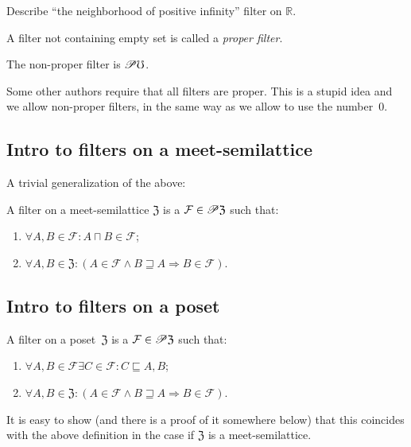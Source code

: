 \begin{xca}
Describe ``the neighborhood of positive infinity'' filter on $\mathbb{R}$.\end{xca}
\begin{defn}
A filter not containing empty set is called
a \emph{proper filter}.\end{defn}
\begin{obvious}
The non-proper filter is $\mathscr{P}\mho$.\end{obvious}
\begin{rem}
Some other authors require that all filters are proper. This is a
stupid idea and we allow non-proper filters, in the same way as we
allow to use the number~$0$.
\end{rem}

\subsection{Intro to filters on a meet-semilattice}

A trivial generalization of the above:
\begin{defn}
A filter on a meet-semilattice
$\mathfrak{Z}$ is a $\mathcal{F}\in\mathscr{P}\mathfrak{Z}$ such that:
\begin{enumerate}
\item $\forall A,B\in\mathcal{F}:A\sqcap B\in\mathcal{F}$;
\item $\forall A,B\in\mathfrak{Z}:(A\in\mathcal{F}\land B\sqsupseteq A\Rightarrow B\in\mathcal{F})$.
\end{enumerate}
\end{defn}

\subsection{Intro to filters on a poset}
\begin{defn}
A filter on a poset~$\mathfrak{Z}$ is
a $\mathcal{F}\in\mathscr{P}\mathfrak{Z}$ such that:
\begin{enumerate}
\item $\forall A,B\in\mathcal{F}\exists C\in\mathcal{F}:C\sqsubseteq A,B$;
\item $\forall A,B\in\mathfrak{Z}:(A\in\mathcal{F}\land B\sqsupseteq A\Rightarrow B\in\mathcal{F})$.
\end{enumerate}
\end{defn}
It is easy to show (and there is a proof of it somewhere below) that
this coincides with the above definition in the case if $\mathfrak{Z}$
is a meet-semilattice.


